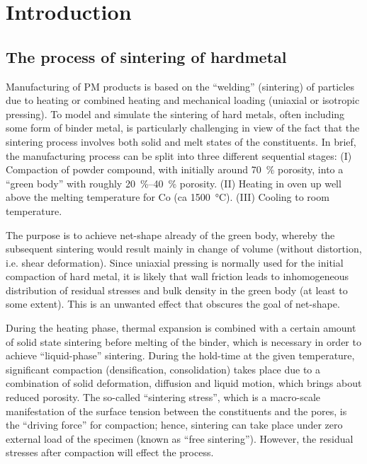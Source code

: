 \documentclass[MikaelDissertation.tex]{subfiles}
\begin{document}
\chapter{Introduction}

\section{The process of sintering of hardmetal}

Manufacturing of PM products is based on the ``welding'' (sintering) of particles due to heating or combined heating and mechanical loading (uniaxial or isotropic pressing).
To model and simulate the sintering of hard metals, often including some form of binder metal, is particularly challenging in view of the fact that the sintering process involves both solid and melt states of the constituents.
In brief, the manufacturing process can be split into three different sequential stages:
(I) Compaction of powder compound, with initially around \SI{70}{\percent} porosity, into a ``green body'' with roughly \SIrange{20}{40}{\percent} porosity.
(II) Heating in oven up well above the melting temperature for Co (ca \SI{1500}{\celsius}).
(III) Cooling to room temperature.

The purpose is to achieve net-shape already of the green body, whereby the subsequent sintering would result mainly in change of volume (without distortion, i.e. shear deformation).
Since uniaxial pressing is normally used for the initial compaction of hard metal, it is likely that wall friction leads to inhomogeneous
distribution of residual stresses and bulk density in the green body (at least to some extent).
This is an unwanted effect that obscures the goal of net-shape.

During the heating phase, thermal expansion is combined with a certain amount of solid state sintering before melting of the binder, which is necessary in order to achieve ``liquid-phase'' sintering.
During the hold-time at the given temperature, significant compaction (densification, consolidation) takes place due to a combination of solid deformation, diffusion and liquid motion, which brings about reduced porosity.
The so-called ``sintering stress'', which is a macro-scale manifestation of the surface tension between the constituents and the pores, is the ``driving force'' for compaction; hence, sintering can take place under zero external load of the specimen (known as ``free sintering'').
However, the residual stresses after compaction will effect the process.
\end{document}
